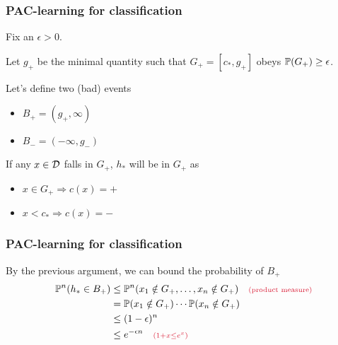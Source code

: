 \documentclass[12pt]{beamer}
\newcommand{\parenthetical}[2]{#1  \scriptstyle \alr{( #2)}}
\begin{document}
\begin{frame}[fragile]
\frametitle{PAC-learning for classification}
%
%
%

 Fix an $\epsilon > 0$.

Let $g_+$ be the minimal quantity such that 
$G_+ = [c_*,g_+]$ obeys $\P(G_+) \geq \epsilon$.  
%
%

\vsp

Let's define two (bad) events 

\begin{itemize}
\item $B_+ = (g_+,\infty)$
\item $B_- = (-\infty, g_-)$
\end{itemize}
\vsp

 If any $x \in \data$ falls in $G_+$, $h_*$ will be in $G_+$ as 
\begin{itemize}
\item[] $x \in G_+ \Rightarrow c(x) = +$
\item[] $x < c_* \Rightarrow c(x) = -$
\end{itemize}
\end{frame}

\begin{frame}[fragile]
\frametitle{PAC-learning for classification}
\vsp


By the previous argument, we can bound the probability of $B_+$
\begin{align*}
\P^n(h_* \in B_+) 
& \leq 
\P^n(x_1 \notin G_+,\ldots, x_n \notin G_+)  \parenthetical{\quad}{\textrm{product measure}}\\
& =
\P(x_1 \notin G_+)\cdots\P(x_n \notin G_+) \\
& \leq
(1-\epsilon)^n  \\
& \leq
e^{-\epsilon n} \parenthetical{\quad}{1+x \leq e^{x}}
\end{align*}
\end{frame}
\end{document}
